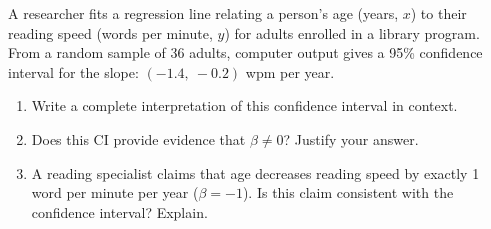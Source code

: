 \documentclass[10pt]{article}
\begin{document}
\namedateperiod

\vspace{0.1in}
A researcher fits a regression line relating a person's age (years, $x$) to their reading
speed (words per minute, $y$) for adults enrolled in a library program. From a random sample
of 36 adults, computer output gives a 95\% confidence interval for the slope:
$(-1.4,\ -0.2)$ wpm per year.

\begin{enumerate}

  \item Write a complete interpretation of this confidence interval in context.


  \item Does this CI provide evidence that $\beta \ne 0$? Justify your answer.


  \item A reading specialist claims that age decreases reading speed by exactly
        1 word per minute per year ($\beta = -1$). Is this claim consistent with the
        confidence interval? Explain.


\end{enumerate}
\end{document}
